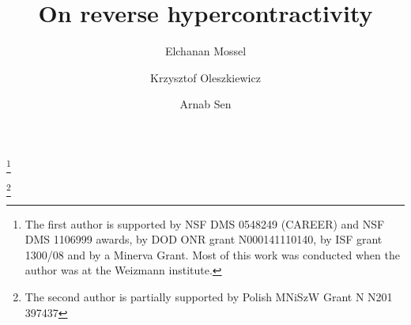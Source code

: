 \documentclass[11pt]{amsart}
\newcommand{\1}{\mathbf{1}}
\theoremstyle{definition}
\theoremstyle{plain}
\theoremstyle{remark}
\numberwithin{equation}{section}
\begin{document}
\title[Reverse hypercontractivity]{On reverse hypercontractivity}

\author{Elchanan Mossel}
\address{Elchanan Mossel \\ Statistics and Computer Science\\  367 Evans Hall \\ University of California \\ Berkeley, CA \\ USA  \& Faculty of Mathematics and Computer Science \\ Weizmann Institute \\ Israel}
\thanks{The first author is supported by NSF DMS
0548249 (CAREER) and NSF DMS 1106999 awards, by DOD ONR grant N000141110140, by ISF
grant 1300/08 and by a Minerva Grant. Most of this work was conducted when the author was at the Weizmann institute.}
\author{Krzysztof Oleszkiewicz}
\address{Krzysztof Oleszkiewicz \\ Institute of Mathematics \\ University of Warsaw \\ul. Banacha 2, 02-097 \\ Warsaw, Poland}
\thanks{The second author is partially supported by Polish MNiSzW Grant N N201 397437}
\author{Arnab Sen}
\address{Arnab Sen \\ Statistical Laboratory, DPMMS, Wilberforce Road, Cambridge, CB3 0WB, United Kingdom}

\date{}
\keywords{}

\maketitle
\end{document}
